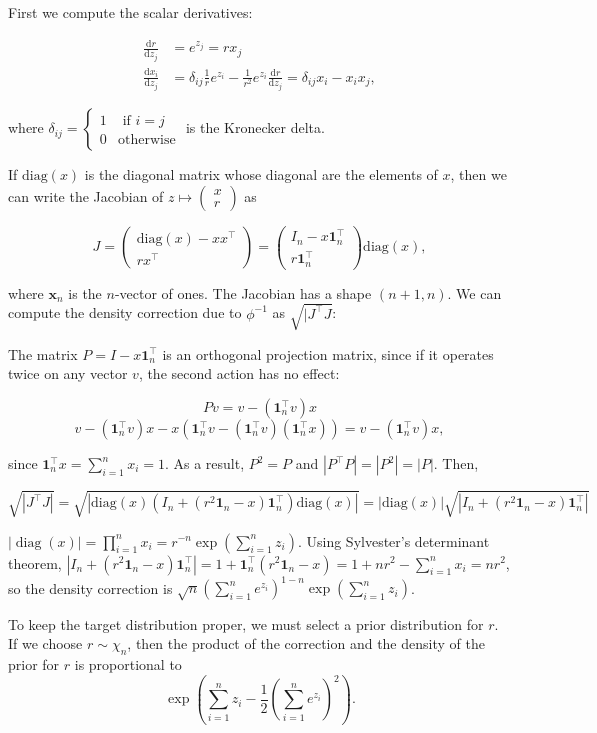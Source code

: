 \documentclass[twoside]{article}
\begin{document}
First we compute the scalar derivatives:

$$
\begin{aligned}
    \frac{\mathrm{d} r}{\mathrm{d} z_j} &= e^{z_j} = r x_j\\
    \frac{\mathrm{d} x_i}{\mathrm{d} z_j} &= \delta_{ij} \frac{1}{r} e^{z_i} - \frac{1}{r^2} e^{z_i} \frac{\mathrm{d} r}{\mathrm{d} z_j} = \delta_{ij} x_i - x_i x_j,
\end{aligned}
$$

where $\delta_{ij} = \begin{cases} 1 &\text{ if } i = j \\ 0 &\text{otherwise}\end{cases}$ is the Kronecker delta.

If $\mathrm{diag}(x)$ is the diagonal matrix whose diagonal are the elements of $x$, then we can write the Jacobian of $z \mapsto \begin{pmatrix}x \\ r \end{pmatrix}$ as

$$J = \begin{pmatrix}\mathrm{diag}(x) - x x^\top \\ r x^\top\end{pmatrix} = \begin{pmatrix}I_n - x \boldsymbol{1}_n^\top \\ r \boldsymbol{1}_n^\top \end{pmatrix} \mathrm{diag}(x),$$

where $\boldsymbol{x}_n$ is the $n$-vector of ones.
The Jacobian has a shape $(n+1,n)$.
We can compute the density correction due to $\phi^{-1}$ as $\sqrt{|J^\top J}$:

The matrix $P = I - x \boldsymbol{1}^\top_n$ is an orthogonal projection matrix, since if it operates twice on any vector $v$, the second action has no effect:

$$Pv = v - (\boldsymbol{1}^\top_n v) x$$
$$v - (\boldsymbol{1}^\top_n v) x - x (\boldsymbol{1}^\top_nv - (\boldsymbol{1}^\top_n v) (\boldsymbol{1}^\top_n x)) = v - (\boldsymbol{1}^\top_n v) x,$$

since $\boldsymbol{1}^\top_n x = \sum_{i=1}^n x_i = 1$.
As a result, $P^2 = P$ and $|P^\top P| = |P^2| = |P|$.
Then,

$$\sqrt{|J^\top J|} = \sqrt{|\mathrm{diag}(x)(I_n + (r^2 \boldsymbol{1}_n - x) \boldsymbol{1}_n^\top)\mathrm{diag}(x)|} = |\mathrm{diag}(x)|\sqrt{|I_n + (r^2 \boldsymbol{1}_n - x) \boldsymbol{1}_n^\top|}$$


$|\operatorname{diag}(x)| = \prod_{i=1}^n x_i = r^{-n} \exp (\sum_{i=1}^n z_i)$. 
Using Sylvester's determinant theorem, $|I_n + (r^2 \boldsymbol{1}_n - x) \boldsymbol{1}_n^\top| = 1 + \boldsymbol{1}_n^\top (r^2 \boldsymbol{1}_n - x) = 1 + n r^2 - \sum_{i=1}^n x_i = n r^2$, so the density correction is $\sqrt{n} (\sum_{i=1}^n e^{z_i})^{1-n} \exp(\sum_{i=1}^n z_i)$.

To keep the target distribution proper, we must select a prior distribution for $r$.
If we choose $r \sim \chi_n$, then the product of the correction and the density of the prior for $r$ is proportional to
$$\exp\left(\sum_{i=1}^n z_i - \frac{1}{2}(\sum_{i=1}^n e^{z_i})^2\right).$$

\vfill
\end{document}
